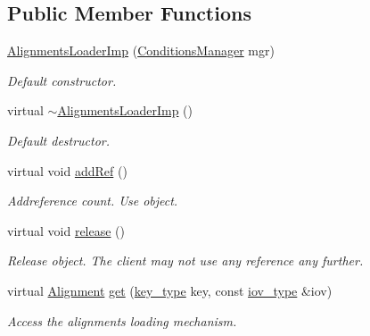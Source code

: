\subsection*{Public Member Functions}
\begin{DoxyCompactItemize}
\item 
\hyperlink{class_d_d4hep_1_1_conditions_1_1_alignments_loader_imp_a82c0f304132e15093e9e2a7a74e33f00}{Alignments\+Loader\+Imp} (\hyperlink{class_d_d4hep_1_1_conditions_1_1_conditions_manager}{Conditions\+Manager} mgr)
\begin{DoxyCompactList}\small\item\em Default constructor. \end{DoxyCompactList}\item 
virtual \hyperlink{class_d_d4hep_1_1_conditions_1_1_alignments_loader_imp_a6d54425e5976b7e45f5e99722fcbbbff}{$\sim$\+Alignments\+Loader\+Imp} ()
\begin{DoxyCompactList}\small\item\em Default destructor. \end{DoxyCompactList}\item 
virtual void \hyperlink{class_d_d4hep_1_1_conditions_1_1_alignments_loader_imp_ac4797b3da6e5543cf505eca8bf9cb405}{add\+Ref} ()
\begin{DoxyCompactList}\small\item\em Addreference count. Use object. \end{DoxyCompactList}\item 
virtual void \hyperlink{class_d_d4hep_1_1_conditions_1_1_alignments_loader_imp_aa9cf749689a76b853f7d7e543f84b761}{release} ()
\begin{DoxyCompactList}\small\item\em Release object. The client may not use any reference any further. \end{DoxyCompactList}\item 
virtual \hyperlink{class_d_d4hep_1_1_conditions_1_1_alignments_loader_imp_a2af19e971736ac6856523194f7eb717a}{Alignment} \hyperlink{class_d_d4hep_1_1_conditions_1_1_alignments_loader_imp_af6db86883e1ab8af6940e3260369228d}{get} (\hyperlink{class_d_d4hep_1_1_alignments_1_1_alignments_loader_af56e6294e72dacbe001c1f24b8381d5d}{key\+\_\+type} key, const \hyperlink{class_d_d4hep_1_1_alignments_1_1_alignments_loader_a632271e6cb9198528a0826d9082561d1}{iov\+\_\+type} \&iov)
\begin{DoxyCompactList}\small\item\em Access the alignments loading mechanism. \end{DoxyCompactList}\item 

\end{DoxyCompactItemize}
